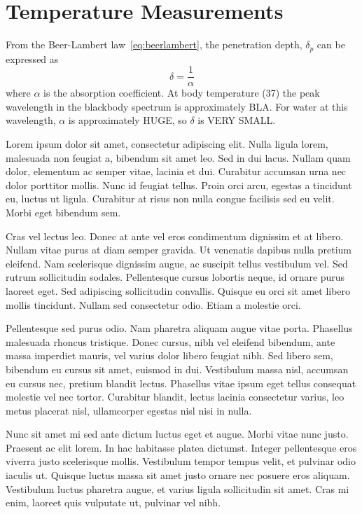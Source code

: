 \section{Temperature Measurements}


From the Beer-Lambert law~\cref{eq:beerlambert}, the penetration depth, $\delta_{p}$ can be expressed as 
\begin{equation}
  \delta = \frac{1}{\alpha} \label{eq:penetrationdepth}
\end{equation}
where $\alpha$ is the absorption coefficient.  At body temperature (37\degree) the peak wavelength in the blackbody spectrum is approximately BLA.  For water at this wavelength, $\alpha$ is approximately HUGE, so $\delta$ is VERY SMALL. 

Lorem ipsum dolor sit amet, consectetur adipiscing elit. Nulla ligula lorem, malesuada non feugiat a, bibendum sit amet leo. Sed in dui lacus. Nullam quam dolor, elementum ac semper vitae, lacinia et dui. Curabitur accumsan urna nec dolor porttitor mollis. Nunc id feugiat tellus. Proin orci arcu, egestas a tincidunt eu, luctus ut ligula. Curabitur at risus non nulla congue facilisis sed eu velit. Morbi eget bibendum sem.

Cras vel lectus leo. Donec at ante vel eros condimentum dignissim et at libero. Nullam vitae purus at diam semper gravida. Ut venenatis dapibus nulla pretium eleifend. Nam scelerisque dignissim augue, ac suscipit tellus vestibulum vel. Sed rutrum sollicitudin sodales. Pellentesque cursus lobortis neque, id ornare purus laoreet eget. Sed adipiscing sollicitudin convallis. Quisque eu orci sit amet libero mollis tincidunt. Nullam sed consectetur odio. Etiam a molestie orci.

Pellentesque sed purus odio. Nam pharetra aliquam augue vitae porta. Phasellus malesuada rhoncus tristique. Donec cursus, nibh vel eleifend bibendum, ante massa imperdiet mauris, vel varius dolor libero feugiat nibh. Sed libero sem, bibendum eu cursus sit amet, euismod in dui. Vestibulum massa nisl, accumsan eu cursus nec, pretium blandit lectus. Phasellus vitae ipsum eget tellus consequat molestie vel nec tortor. Curabitur blandit, lectus lacinia consectetur varius, leo metus placerat nisl, ullamcorper egestas nisl nisi in nulla.

Nunc sit amet mi sed ante dictum luctus eget et augue. Morbi vitae nunc justo. Praesent ac elit lorem. In hac habitasse platea dictumst. Integer pellentesque eros viverra justo scelerisque mollis. Vestibulum tempor tempus velit, et pulvinar odio iaculis ut. Quisque luctus massa sit amet justo ornare nec posuere eros aliquam. Vestibulum luctus pharetra augue, et varius ligula sollicitudin sit amet. Cras mi enim, laoreet quis vulputate ut, pulvinar vel nibh.

